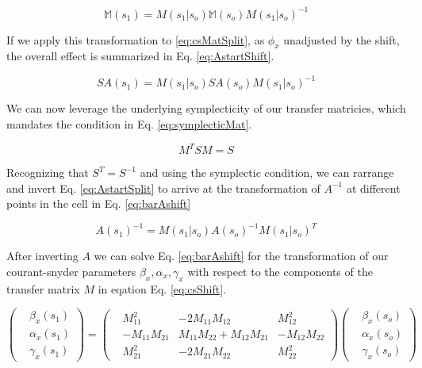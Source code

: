 \begin{equation} \label{eq:startShift}
	\mathbb{M}(s_1)  = M(s_1|s_o)\mathbb{M}(s_o)M(s_1|s_o)^{-1}
\end{equation}

If we apply this transformation to \ref{eq:csMatSplit}, as $\phi_x$ unadjusted by the shift, the overall effect is summarized in Eq. \ref{eq:AstartShift}.

\begin{equation} \label{eq:AstartShift}
	S A(s_1) = M(s_1|s_o) S A(s_o)M(s_1|s_o)^{-1}
\end{equation}

We can now leverage the underlying symplecticity of our transfer matricies, which mandates the condition in Eq. \ref{eq:symplecticMat}.

\begin{equation} \label{eq:symplecticMat}
	M^T S M = S
\end{equation}

Recognizing that $S^T = S^{-1}$ and using the symplectic condition, we can rarrange and invert Eq. \ref{eq:AstartSplit} to arrive at the transformation of $A^{-1}$ at different points in the cell in Eq. \ref{eq:barAshift} 

\begin{equation} \label{eq:barAshift}
	A(s_1)^{-1} = M(s_1|s_o)  A(s_o)^{-1} M(s_1|s_o)^T
\end{equation}

After inverting $A$ we can solve Eq. \ref{eq:barAshift} for the transformation of our courant-snyder parameters $\beta_x, \alpha_x, \gamma_x$ with respect to the components of the transfer matrix $M$ in eqation Eq. \ref{eq:csShift}.

\begin{equation} \label{eq:csShift}
	\begin{pmatrix} &\beta_x(s_1) \\ &\alpha_x(s_1)\\ &\gamma_x(s_1) \end{pmatrix} = 
	\begin{pmatrix}
		&M_{11}^2 &-2 M_{11} M_{12} &M_{12}^2\\
		&-M_{11} M_{21} &M_{11} M_{22} + M_{12} M_{21} &-M_{12}M_{22}\\
		&M_{21}^2 &-2 M_{21} M_{22} &M_{22}^2
	\end{pmatrix}
	\begin{pmatrix} &\beta_x(s_o) \\ &\alpha_x(s_o)\\ &\gamma_x(s_o) \end{pmatrix}
\end{equation}

